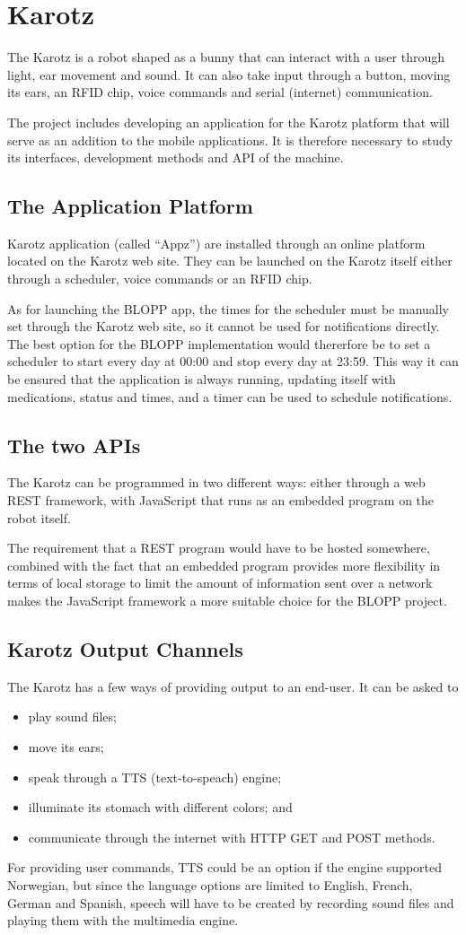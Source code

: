 \section{Karotz}
The Karotz is a robot shaped as a bunny that can interact with
a user through light, ear movement and sound. It can also take
input through a button, moving its ears, an RFID chip, voice
commands and serial (internet) communication.

The project includes developing an application for the Karotz
platform that will serve as an addition to the mobile applications.
It is therefore necessary to study its interfaces, development
methods and API of the machine.

\subsection{The Application Platform}
Karotz application (called ``Appz'') are installed through an
online platform located on the Karotz web site. They can be
launched on the Karotz itself either through a scheduler, voice
commands or an RFID chip. 

As for launching the BLOPP app, the times for the scheduler must
be manually set through the Karotz web site, so it cannot be 
used for notifications directly. The best option for the BLOPP 
implementation would thererfore be to set a scheduler to start
every day at 00:00 and stop every day at 23:59. This way it can
be ensured that the application is always running, updating
itself with medications, status and times, and a timer can be
used to schedule notifications.

\subsection{The two APIs}
The Karotz can be programmed in two different ways: either
through a web REST framework, with JavaScript that runs as an
embedded program on the robot itself.

The requirement that a REST program would have to be hosted
somewhere, combined with the fact that an embedded program 
provides more flexibility in terms of local storage to limit the
amount of information sent over a network makes the JavaScript
framework a more suitable choice for the BLOPP project.

\subsection{Karotz Output Channels}
The Karotz has a few ways of providing output to an end-user. It
can be asked to
\begin{itemize}
    \item play sound files;
    \item move its ears;
    \item speak through a TTS (text-to-speach) engine;
    \item illuminate its stomach with different colors;
    and
    \item communicate through the internet with HTTP GET and POST 
          methods.
\end{itemize}

For providing user commands, TTS could be an option if the engine
supported Norwegian, but since the language options are limited to
English, French, German and Spanish, speech will have to be
created by recording sound files and playing them with the
multimedia engine.